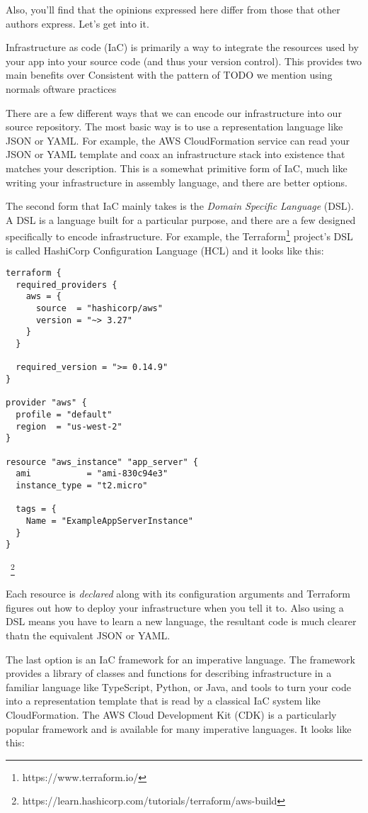 \documentclass{article}
\newcommand{\noterm}[1]{\textit{#1}}
\newcommand{\term}[1]{\noterm{#1}\index{#1}}
\begin{document}
Also, you'll find that the opinions expressed here differ from those that other authors express. Let's get into it.

Infrastructure as code (IaC) is primarily a way to integrate the resources used by your app into your source code (and thus your version control).
This provides two main benefits over 
Consistent with the pattern of TODO we 
mention using normals oftware practices

There are a few different ways that we can encode our infrastructure into our source repository.
The most basic way is to use a representation language like JSON or YAML.
For example, the AWS CloudFormation service can read your JSON or YAML template and coax an infrastructure stack into existence that matches your description.
This is a somewhat primitive form of IaC, much like writing your infrastructure in assembly language, and there are better options.

The second form that IaC mainly takes is the \term{Domain Specific Language} (DSL).
A DSL is a language built for a particular purpose, and there are a few designed specifically to encode infrastructure.
For example, the Terraform\footnote{https://www.terraform.io/} project's DSL is called HashiCorp Configuration Language (HCL) and it looks like this:

\begin{verbatim}
terraform {
  required_providers {
    aws = {
      source  = "hashicorp/aws"
      version = "~> 3.27"
    }
  }

  required_version = ">= 0.14.9"
}

provider "aws" {
  profile = "default"
  region  = "us-west-2"
}

resource "aws_instance" "app_server" {
  ami           = "ami-830c94e3"
  instance_type = "t2.micro"

  tags = {
    Name = "ExampleAppServerInstance"
  }
}
\end{verbatim}~\footnote{https://learn.hashicorp.com/tutorials/terraform/aws-build}

Each resource is \textit{declared} along with its configuration arguments and Terraform figures out how to deploy your infrastructure when you tell it to.
Also using a DSL means you have to learn a new language, the resultant code is much clearer thatn the equivalent JSON or YAML.

The last option is an IaC framework for an imperative language.
The framework provides a library of classes and functions for describing infrastructure in a familiar language like TypeScript, Python, or Java, and tools to turn your code into a representation template that is read by a classical IaC system like CloudFormation.
The AWS Cloud Development Kit (CDK) is a particularly popular framework and is available for many imperative languages.
It looks like this:
\end{document}
